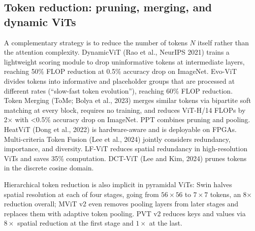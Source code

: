 \documentclass{article}
\begin{document}
\subsection{Token reduction: pruning, merging, and dynamic ViTs}\label{token-reduction-pruning-merging-and-dynamic-vits}

A complementary strategy is to reduce the number of tokens \(N\) itself rather than the attention complexity. DynamicViT (Rao et al., NeurIPS 2021) trains a lightweight scoring module to drop uninformative tokens at intermediate layers, reaching 50\% FLOP reduction at 0.5\% accuracy drop on ImageNet. Evo-ViT \citep{xu2022multiclasstokentra} divides tokens into informative and placeholder groups that are processed at different rates (``slow-fast token evolution''), reaching 60\% FLOP reduction. Token Merging (ToMe; Bolya et al., 2023) merges similar tokens via bipartite soft matching at every block, requires no training, and reduces ViT-H/14 FLOPs by 2× with \textless0.5\% accuracy drop on ImageNet. PPT \citep{wu2023revisitingclassifi} combines pruning and pooling. HeatViT (Dong et al., 2022) is hardware-aware and is deployable on FPGAs. Multi-criteria Token Fusion (Lee et al., 2024) jointly considers redundancy, importance, and diversity. LF-ViT \citep{hu2024lfvitreducingspati} reduces spatial redundancy in high-resolution ViTs and saves 35\% computation. DCT-ViT (Lee and Kim, 2024) prunes tokens in the discrete cosine domain.

Hierarchical token reduction is also implicit in pyramidal ViTs: Swin halves spatial resolution at each of four stages, going from \(56 \times 56\) to \(7 \times 7\) tokens, an 8× reduction overall; MViT v2 even removes pooling layers from later stages and replaces them with adaptive token pooling. PVT v2 reduces keys and values via \(8 \times\) spatial reduction at the first stage and \(1 \times\) at the last.
\end{document}
